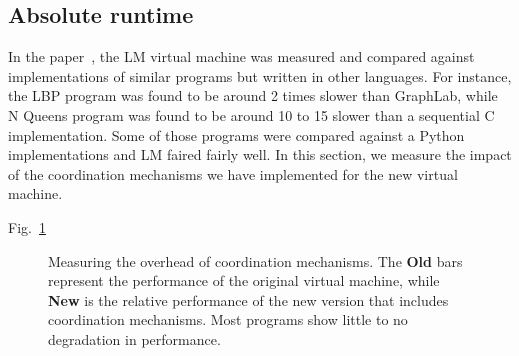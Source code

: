 \subsection{Absolute runtime}

In the paper~\cite{cruz-ppdp14}, the LM virtual machine was measured and
compared against implementations of similar programs but written in other
languages. For instance, the LBP program was found to be around 2 times slower
than GraphLab, while N Queens program was found to be around 10 to 15 slower
than a sequential C implementation. Some of those programs were compared against
a Python implementations and LM faired fairly well. In this section, we measure
the impact of the coordination mechanisms we have implemented for the new
virtual machine.

Fig.~\ref{results:comparison1}

\begin{figure}[h!]
   \begin{center}
   \end{center}
   \caption{Measuring the overhead of coordination mechanisms. The \textbf{Old}
   bars represent the performance of the original virtual machine, while
   \textbf{New} is the relative performance of the new version that includes
   coordination mechanisms. Most programs show little to no degradation in
   performance.}
   \label{results:comparison1}
\end{figure}
